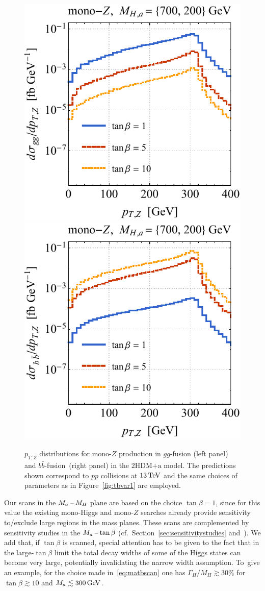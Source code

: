 \documentclass[a4paper, 11pt,notoc]{article}
\newcommand{\ma}{\ensuremath{M_{a}}\xspace}
\newcommand{\hdma}{\ensuremath{\textrm{2HDM+a}}\xspace}
\begin{document}
 \begin{figure}[t!]
\centering
\includegraphics[height=0.45\textwidth]{tblz.pdf} \qquad 
\includegraphics[height=0.45\textwidth]{tbrz.pdf}
\vspace{2mm}
\vspace{2mm}
\caption{\label{fig:tbvar2} 
$p_{T,Z}$ distributions for mono-$Z$ production in $gg$-fusion (left panel) and $b \bar b$-fusion~(right panel) in the \hdma model. The  predictions shown correspond to $pp$ collisions at $13 \, {\rm TeV}$ and the same choices of parameters as in Figure~\ref{fig:tbvar1} are employed.}
\end{figure}

Our  scans in the $M_{a}\hspace{0.5mm}$--$\hspace{0.5mm} M_H$ plane are based on the choice $\tan \beta = 1$, since for this value the existing mono-Higgs and mono-$Z$ searches already provide sensitivity to/exclude large regions in the mass planes.  These  scans are complemented by sensitivity studies in the $\ma \hspace{0.5mm}$--$\hspace{0.5mm} \tan \beta$ (cf.~Section~\ref{sec:sensitivitystudies} and~\cite{No:2015xqa,Bauer:2017ota,Pani:2017qyd}).  We add that, if $\tan \beta$ is scanned, special attention has to be given to the fact that in the large-$\tan \beta$ limit the total decay widths of some of the Higgs states can become very large, potentially invalidating the narrow width assumption.   To~give an example, for the choice made in~\eqref{eq:matbscan} one has $\Gamma_{H}/M_H \gtrsim 30\%$ for $\tan \beta \gtrsim 10$ and $M_a \lesssim 300 \, {\rm GeV}$. 
\end{document}
